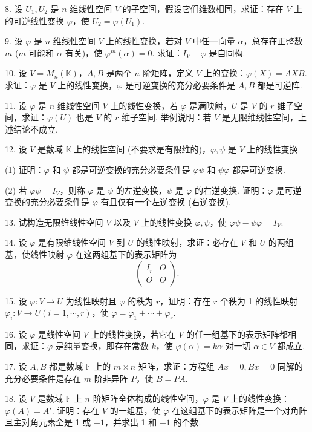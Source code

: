\documentclass[UTF8, 12pt, fontset=fandol, oneside]{ctexart}
\begin{document}
8. 设 $U_1,U_2$ 是 $n$ 维线性空间 $V$ 的子空间，假设它们维数相同，求证：存在 $V$ 上的可逆线性变换 $\varphi$，使 $U_2=\varphi(U_1)$.

9. 设 $\varphi$ 是 $n$ 维线性空间 $V$ 上的线性变换，若对 $V$ 中任一向量 $\alpha$，总存在正整数 $m$ ($m$ 可能和 $\alpha$ 有关)，使 $\varphi^m(\alpha)=0$. 求证：$I_V-\varphi$ 是自同构.

10. 设 $V=M_n(\mathbb{K})$，$A,B$ 是两个 $n$ 阶矩阵，定义 $V$ 上的变换：$\varphi(X)=AXB$. 求证：$\varphi$ 是 $V$ 上的线性变换，$\varphi$ 是可逆变换的充分必要条件是 $A,B$ 都是可逆阵.

11. 设 $\varphi$ 是 $n$ 维线性空间 $V$ 上的线性变换，若 $\varphi$ 是满映射，$U$ 是 $V$ 的 $r$ 维子空间，求证：$\varphi(U)$ 也是 $V$ 的 $r$ 维子空间. 举例说明：若 $V$ 是无限维线性空间，上述结论不成立.

12. 设 $V$ 是数域 $\mathbb{K}$ 上的线性空间 (不要求是有限维的)，$\varphi,\psi$ 是 $V$ 上的线性变换.

(1) 证明：$\varphi$ 和 $\psi$ 都是可逆变换的充分必要条件是 $\varphi\psi$ 和 $\psi\varphi$ 都是可逆变换.

(2) 若 $\varphi\psi=I_V$，则称 $\varphi$ 是 $\psi$ 的左逆变换，$\psi$ 是 $\varphi$ 的右逆变换. 证明：$\varphi$ 是可逆变换的充分必要条件是 $\varphi$ 有且仅有一个左逆变换 (右逆变换).

13. 试构造无限维线性空间 $V$ 以及 $V$ 上的线性变换 $\varphi,\psi$，使 $\varphi\psi-\psi\varphi=I_V$.

14. 设 $\varphi$ 是有限维线性空间 $V$ 到 $U$ 的线性映射，求证：必存在 $V$ 和 $U$ 的两组基，使线性映射 $\varphi$ 在这两组基下的表示矩阵为
\[
\left(\begin{array}{cc}
I_r & O\\
O & O
\end{array}\right).
\]

15. 设 $\varphi:V\to U$ 为线性映射且 $\varphi$ 的秩为 $r$，证明：存在 $r$ 个秩为 1 的线性映射 $\varphi_i:V\to U(i=1,\cdots,r)$，使 $\varphi=\varphi_1+\cdots+\varphi_r$.

16. 设 $\varphi$ 是线性空间 $V$ 上的线性变换，若它在 $V$ 的任一组基下的表示矩阵都相同，求证：$\varphi$ 是纯量变换，即存在常数 $k$，使 $\varphi(\alpha)=k\alpha$ 对一切 $\alpha\in V$ 都成立.

17. 设 $A,B$ 都是数域 $\mathbb{F}$ 上的 $m\times n$ 矩阵，求证：方程组 $Ax=0,Bx=0$ 同解的充分必要条件是存在 $m$ 阶非异阵 $P$，使 $B=PA$.

18. 设 $V$ 是数域 $\mathbb{F}$ 上 $n$ 阶矩阵全体构成的线性空间，$\varphi$ 是 $V$ 上的线性变换：$\varphi(A)=A'$. 证明：存在 $V$ 的一组基，使 $\varphi$ 在这组基下的表示矩阵是一个对角阵且主对角元素全是 1 或 $-1$，并求出 1 和 $-1$ 的个数.
\end{document}
